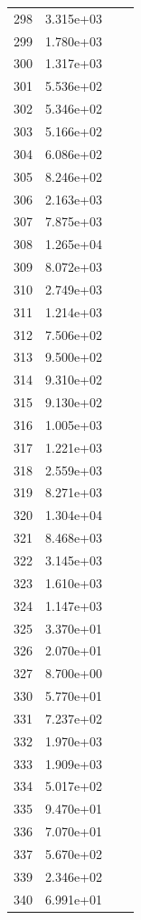 \documentclass[12pt]{article}
\begin{document}
\begin{longtable}{@{}cccc@{}}
298 & 3.315e+03 &  &  \\
299 & 1.780e+03 &  &  \\
300 & 1.317e+03 &  &  \\
301 & 5.536e+02 &  &  \\
302 & 5.346e+02 &  &  \\
303 & 5.166e+02 &  &  \\
304 & 6.086e+02 &  &  \\
305 & 8.246e+02 &  &  \\
306 & 2.163e+03 &  &  \\
307 & 7.875e+03 &  &  \\
308 & 1.265e+04 &  &  \\
309 & 8.072e+03 &  &  \\
310 & 2.749e+03 &  &  \\
311 & 1.214e+03 &  &  \\
312 & 7.506e+02 &  &  \\
313 & 9.500e+02 &  &  \\
314 & 9.310e+02 &  &  \\
315 & 9.130e+02 &  &  \\
316 & 1.005e+03 &  &  \\
317 & 1.221e+03 &  &  \\
318 & 2.559e+03 &  &  \\
319 & 8.271e+03 &  &  \\
320 & 1.304e+04 &  &  \\
321 & 8.468e+03 &  &  \\
322 & 3.145e+03 &  &  \\
323 & 1.610e+03 &  &  \\
324 & 1.147e+03 &  &  \\
325 & 3.370e+01 &  &  \\
326 & 2.070e+01 &  &  \\
327 & 8.700e+00 &  &  \\
330 & 5.770e+01 &  &  \\
331 & 7.237e+02 &  &  \\
332 & 1.970e+03 &  &  \\
333 & 1.909e+03 &  &  \\
334 & 5.017e+02 &  &  \\
335 & 9.470e+01 &  &  \\
336 & 7.070e+01 &  &  \\
337 & 5.670e+02 &  &  \\
339 & 2.346e+02 &  &  \\
340 & 6.991e+01 &  &  \\

\end{longtable}
\end{document}
